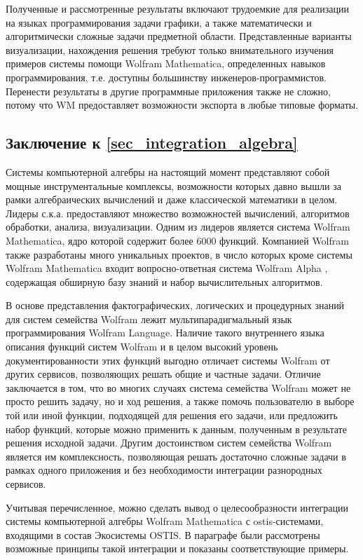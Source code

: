 Полученные и рассмотренные результаты включают трудоемкие для реализации на языках программирования задачи графики, а также математически и алгоритмически сложные задачи предметной области. Представленные варианты визуализации, нахождения решения требуют только внимательного изучения примеров системы помощи Wolfram Mathematica, определенных навыков программирования, т.е. доступны большинству инженеров-программистов. Перенести результаты в другие программные приложения также не сложно, потому что WM предоставляет возможности экспорта в любые типовые форматы.

\subsection*{Заключение к \ref{sec_integration_algebra}}

Системы компьютерной алгебры на настоящий момент представляют собой мощные инструментальные комплексы, возможности которых давно вышли за рамки алгебраических вычислений и даже классической математики в целом. Лидеры с.к.а. предоставляют множество возможностей вычислений, алгоритмов обработки, анализа, визуализации. Одним из лидеров является система Wolfram Mathematica, ядро которой содержит более 6000 функций. Компанией Wolfram также разработаны много уникальных проектов, в число которых кроме системы Wolfram Mathematica входит вопросно-ответная система Wolfram Alpha \cite{WolframAlpha}, содержащая обширную базу знаний и набор вычислительных алгоритмов. 

В основе представления фактографических, логических и процедурных знаний для систем семейства Wolfram лежит мультипарадигмальный язык программирования Wolfram Language. Наличие такого внутреннего языка описания функций систем Wolfram и в целом высокий уровень документированности этих функций выгодно отличает системы Wolfram от других сервисов, позволяющих решать общие и частные задачи. Отличие заключается в том, что во многих случаях система семейства Wolfram может не просто решить задачу, но и  ход решения, а также помочь пользователю в выборе той или иной функции, подходящей для решения его задачи, или предложить набор функций, которые можно применить к данным, полученным в результате решения исходной задачи. Другим достоинством систем семейства Wolfram является им комплексность, позволяющая решать достаточно сложные задачи в рамках одного приложения и без необходимости интеграции разнородных сервисов.

Учитывая перечисленное, можно сделать вывод о целесообразности интеграции системы компьютерной алгебры Wolfram Mathematica с ostis-системами, входящими в состав Экосистемы OSTIS. В параграфе были рассмотрены возможные принципы такой интеграции и показаны соответствующие примеры.
